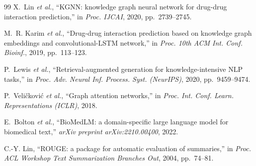 \documentclass[12pt,a4paper,oneside]{report}
\begin{document}
\begin{thebibliography}{99}
X.~Lin \textit{et al.},
``KGNN: knowledge graph neural network for drug-drug interaction prediction,''
in \textit{Proc. IJCAI}, 2020, pp.~2739--2745.

M.~R. Karim \textit{et al.},
``Drug-drug interaction prediction based on knowledge graph embeddings and
convolutional-LSTM network,''
in \textit{Proc. 10th ACM Int. Conf. Bioinf.}, 2019, pp.~113--123.

P.~Lewis \textit{et al.},
``Retrieval-augmented generation for knowledge-intensive NLP tasks,''
in \textit{Proc. Adv. Neural Inf. Process. Syst. (NeurIPS)}, 2020,
pp.~9459--9474.

P.~Veli\v{c}kovi\'c \textit{et al.},
``Graph attention networks,''
in \textit{Proc. Int. Conf. Learn. Representations (ICLR)}, 2018.

E.~Bolton \textit{et al.},
``BioMedLM: a domain-specific large language model for biomedical text,''
\textit{arXiv preprint arXiv:2210.00400}, 2022.

C.-Y. Lin,
``ROUGE: a package for automatic evaluation of summaries,''
in \textit{Proc. ACL Workshop Text Summarization Branches Out}, 2004,
pp.~74--81.

\end{thebibliography}
\end{document}
